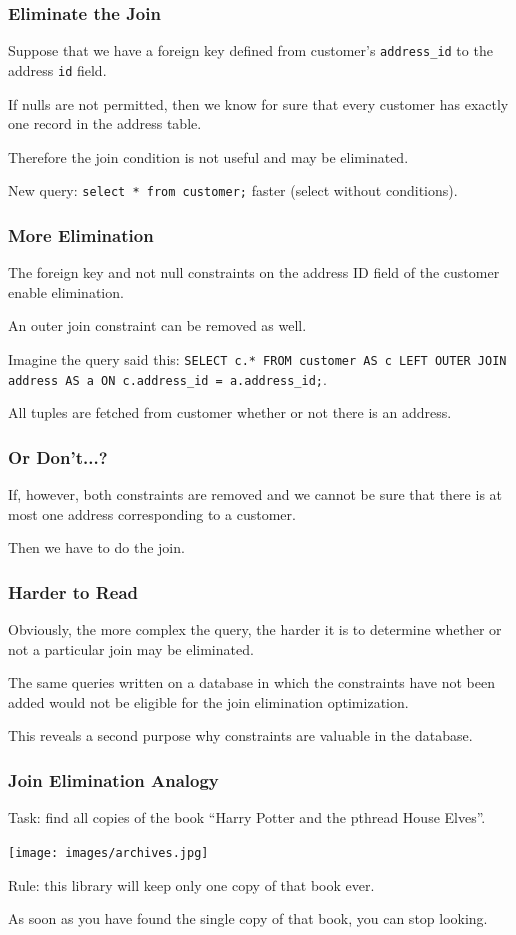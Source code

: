 \begin{frame}
\frametitle{Eliminate the Join}

Suppose that we have a foreign key defined from customer's \texttt{address\_id} to the address \texttt{id} field. 

If nulls are not permitted, then we know for sure that every customer has exactly one record in the address table.

Therefore the join condition is not useful and may be eliminated. 

New query: \texttt{select * from customer;} faster (select without conditions).


\end{frame}

\begin{frame}
\frametitle{More Elimination}

The foreign key and not null constraints on the address ID field of the customer enable elimination.

An outer join constraint can be removed as well.

Imagine the query said this: \texttt{SELECT c.* FROM customer AS c LEFT OUTER JOIN address AS a ON c.address\_id = a.address\_id;}. 

All tuples are fetched from customer whether or not there is an address. 

\end{frame}

\begin{frame}
\frametitle{Or Don't...?}

If, however, both constraints are removed and we cannot be sure that there is at most one address corresponding to a customer.

Then we have to do the join.


\end{frame}

\begin{frame}
\frametitle{Harder to Read}
Obviously, the more complex the query, the harder it is to determine whether or not a particular join may be eliminated. 

The same queries written on a database in which the constraints have not been added would not be eligible for the join elimination optimization. 

This reveals a second purpose why constraints are valuable in the database.

\end{frame}

\begin{frame}
\frametitle{Join Elimination Analogy}
Task: find all copies of the book ``Harry Potter and the pthread House Elves''. 


\begin{center}
	\texttt{[image: images/archives.jpg]}
\end{center}

Rule: this library will keep only one copy of that book ever. 

As soon as you have found the single copy of that book, you can stop looking.

\end{frame}

